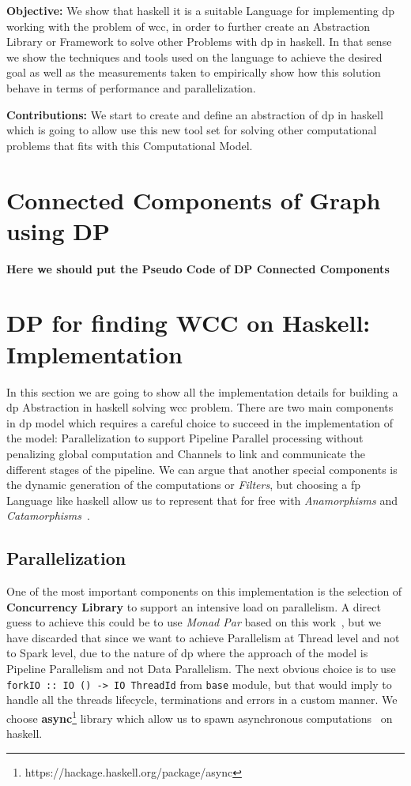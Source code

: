 \documentclass[12pt]{article}
\begin{document}
\textbf{Objective:} We show that \acrshort{haskell} it is a suitable Language for implementing \acrshort{dp} working with the problem of \acrshort{wcc}, in order to further create an Abstraction Library or Framework
to solve other Problems with \acrshort{dp} in \acrshort{haskell}.
In that sense we show the techniques and tools used on the language to achieve the desired goal as well as the measurements taken to empirically show how this solution behave in terms of performance and parallelization.

\textbf{Contributions:} We start to create and define an abstraction of \acrshort{dp} in \acrshort{haskell} which is going to allow use this new tool set for solving other computational problems that fits with this Computational Model.

\section{Connected Components of Graph using DP}
\textbf{Here we should put the Pseudo Code of DP Connected Components}

\section{DP for finding WCC on Haskell: Implementation}
In this section we are going to show all the implementation details for building a \acrshort{dp} Abstraction in \acrshort{haskell} solving \acrshort{wcc} problem.
There are two main components in \acrshort{dp} model which requires a careful choice to succeed in the implementation of the model: Parallelization to support Pipeline Parallel processing without penalizing global computation and Channels to link and communicate 
the different stages of the pipeline. We can argue that another special components is the dynamic generation of the computations or \textit{Filters}, but choosing a \acrfull{fp} Language like \acrshort{haskell} allow us to represent
that for free with \textit{Anamorphisms} and \textit{Catamorphisms}~\cite{lenses}.

\subsection{Parallelization}
One of the most important components on this implementation is the selection of \textbf{Concurrency Library} to support an intensive load on parallelism. A direct guess to achieve this
could be to use \textit{Monad Par} based on this work~\cite{monad_par}, but we have discarded that since we want to achieve Parallelism at Thread level and not to Spark level, due to the nature
of \acrshort{dp} where the approach of the model is Pipeline Parallelism and not Data Parallelism. The next obvious choice is to use \texttt{forkIO :: IO () -> IO ThreadId} from \texttt{base}
module, but that would imply to handle all the threads lifecycle, terminations and errors in a custom manner. We choose \textbf{async}\footnote{https://hackage.haskell.org/package/async} 
library which allow us to spawn asynchronous computations~\cite{parallel_book} on \acrshort{haskell}.
\end{document}
